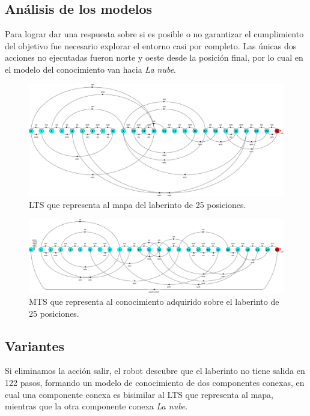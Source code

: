 \clearpage

\subsection{Análisis de los modelos}

Para lograr dar una respuesta sobre si es posible o no garantizar el cumplimiento del objetivo fue necesario 
explorar el entorno casi por completo. Las únicas dos acciones no ejecutadas fueron norte y oeste desde la posición 
final, por lo cual en el modelo del conocimiento van hacia \textit{La nube}.

\begin{figure}[H]
	\centering
		\includegraphics[width=1.0\textwidth]{Imagenes/Laberintos/25_view.jpg}
	\caption{LTS que representa al mapa del laberinto de 25 posiciones.}
	\label{fig:25_view}
\end{figure}

\begin{figure}[H]
	\centering
		\includegraphics[width=1.0\textwidth]{Imagenes/Laberintos/25_knowledge.jpg}
	\caption{MTS que representa al conocimiento adquirido sobre el laberinto de 25 posiciones.}
	\label{fig:25_knowledge}
\end{figure}

\clearpage

\subsection{Variantes}

Si eliminamos la acción salir, el robot descubre que el laberinto no tiene salida en 122 pasos, formando un modelo 
de conocimiento de dos componentes conexas, en cual una componente conexa es bisimilar al LTS que representa al mapa, 
mientras que la otra componente conexa \textit{La nube}.

